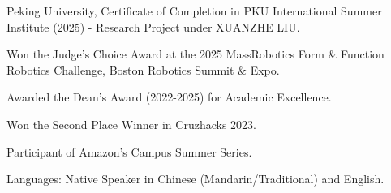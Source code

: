 \vspace{1.0mm}
\begin{cventries}
  \cvend
    {
      \begin{cvitems} %
        \item {Peking University, Certificate of Completion in PKU International Summer Institute (2025) - Research Project under XUANZHE LIU.}
        \item {Won the Judge's Choice Award at the 2025 MassRobotics Form \& Function Robotics Challenge, Boston Robotics Summit \& Expo.}
        \item {Awarded the Dean's Award (2022-2025) for Academic Excellence.}
        \item {Won the Second Place Winner in Cruzhacks 2023.}
        \item {Participant of Amazon's Campus Summer Series.}
        \item {Languages: Native Speaker in Chinese (Mandarin/Traditional) and English.}
      \end{cvitems}
    }
\end{cventries}
